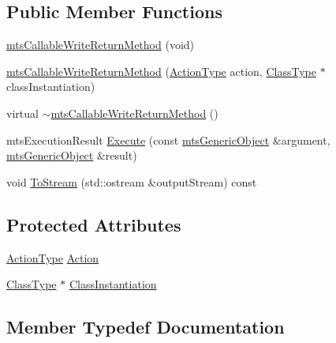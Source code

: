 \subsection*{Public Member Functions}
\begin{DoxyCompactItemize}
\item 
\hyperlink{classmts_callable_write_return_method_a772c565f1a82229cbf1be0cd257ddd98}{mts\+Callable\+Write\+Return\+Method} (void)
\item 
\hyperlink{classmts_callable_write_return_method_ab131f7ec5ecbf8b49fa51a7e09163b6b}{mts\+Callable\+Write\+Return\+Method} (\hyperlink{classmts_callable_write_return_method_a650562eae4db20a5cfbbff0f9f7e1a0a}{Action\+Type} action, \hyperlink{classmts_callable_write_return_method_a51dbe6298941ab172d83182c8188092d}{Class\+Type} $\ast$class\+Instantiation)
\item 
virtual \hyperlink{classmts_callable_write_return_method_a894a51147b26a6b6da76ffd32730d383}{$\sim$mts\+Callable\+Write\+Return\+Method} ()
\item 
mts\+Execution\+Result \hyperlink{classmts_callable_write_return_method_a18090c504b35a9f4142fd1f64365a1db}{Execute} (const \hyperlink{classmts_generic_object}{mts\+Generic\+Object} \&argument, \hyperlink{classmts_generic_object}{mts\+Generic\+Object} \&result)
\item 
void \hyperlink{classmts_callable_write_return_method_a5b79eed629e5634a62de1a6056571686}{To\+Stream} (std\+::ostream \&output\+Stream) const 
\end{DoxyCompactItemize}
\subsection*{Protected Attributes}
\begin{DoxyCompactItemize}
\item 
\hyperlink{classmts_callable_write_return_method_a650562eae4db20a5cfbbff0f9f7e1a0a}{Action\+Type} \hyperlink{classmts_callable_write_return_method_a3602dcc1749010bd68b5797ea137fd44}{Action}
\item 
\hyperlink{classmts_callable_write_return_method_a51dbe6298941ab172d83182c8188092d}{Class\+Type} $\ast$ \hyperlink{classmts_callable_write_return_method_abf8e145001a1e02c63a7cc66ee87f066}{Class\+Instantiation}
\end{DoxyCompactItemize}


\subsection{Member Typedef Documentation}
\hypertarget{classmts_callable_write_return_method_a650562eae4db20a5cfbbff0f9f7e1a0a}{}
